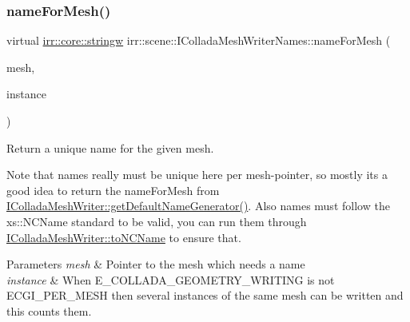 \subsubsection{\texorpdfstring{name\+For\+Mesh()}{nameForMesh()}\hspace{0.1cm}{\footnotesize\ttfamily [1/2]}}
{\footnotesize\ttfamily virtual \hyperlink{namespaceirr_1_1core_a5aedb62cb47cf01d1c548ab5e6344d2d}{irr\+::core\+::stringw} irr\+::scene\+::\+I\+Collada\+Mesh\+Writer\+Names\+::name\+For\+Mesh (\begin{DoxyParamCaption}\item[{const \hyperlink{classirr_1_1scene_1_1IMesh}{scene\+::\+I\+Mesh} $\ast$}]{mesh,  }\item[{int}]{instance }\end{DoxyParamCaption})\hspace{0.3cm}{\ttfamily [pure virtual]}}



Return a unique name for the given mesh. 

Note that names really must be unique here per mesh-\/pointer, so mostly it\textquotesingle{}s a good idea to return the name\+For\+Mesh from \hyperlink{classirr_1_1scene_1_1IColladaMeshWriter_acd10fcf2458271d59cf76284613288f6}{I\+Collada\+Mesh\+Writer\+::get\+Default\+Name\+Generator()}. Also names must follow the xs\+::\+N\+C\+Name standard to be valid, you can run them through \hyperlink{classirr_1_1scene_1_1IColladaMeshWriter_ac9c48beab095aa6f4cb4f696bb2ecd45}{I\+Collada\+Mesh\+Writer\+::to\+N\+C\+Name} to ensure that. 
\begin{DoxyParams}{Parameters}
{\em mesh} & Pointer to the mesh which needs a name \\
\hline
{\em instance} & When E\+\_\+\+C\+O\+L\+L\+A\+D\+A\+\_\+\+G\+E\+O\+M\+E\+T\+R\+Y\+\_\+\+W\+R\+I\+T\+I\+NG is not E\+C\+G\+I\+\_\+\+P\+E\+R\+\_\+\+M\+E\+SH then several instances of the same mesh can be written and this counts them. \\
\hline
\end{DoxyParams}
\mbox{\label{classirr_1_1scene_1_1IColladaMeshWriterNames_a2d36f1dee5904b3c622363282761ed0d}} 
